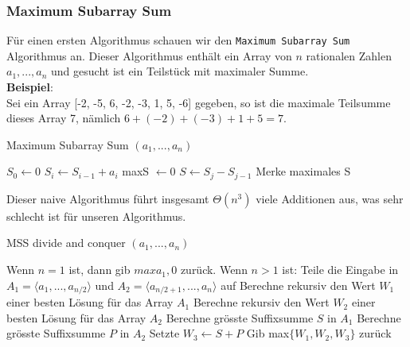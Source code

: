 \documentclass[a4paper]{article}
\begin{document}
    \subsubsection{Maximum Subarray Sum}
    Für einen ersten Algorithmus schauen wir den \texttt{Maximum Subarray Sum} Algorithmus an. Dieser Algorithmus enthält ein Array von $n$ rationalen Zahlen $a_1,..., a_n$ und gesucht ist ein Teilstück mit maximaler Summe.  \\
    \textbf{Beispiel}: \\
    Sei ein Array [-2, -5, 6, -2, -3, 1, 5, -6] gegeben, so ist die maximale Teilsumme dieses Array 7, nämlich $ 6 + (-2) + (-3) + 1 + 5 = 7$. \\
      
\begin{algorithm}
    \caption{Maximum Subarray Sum $(a_1,..., a_n)$}
    \label{alg:MSS-1}
    \begin{algorithmic}[1]
    \State $S_0 \gets 0$ 
        \State $S_i \gets S_{i-1} + a_i$ 
    \EndFor
    \State maxS $\gets 0$
            \State $S \gets S_j - S_{j-1}$ 
           \State Merke maximales S
        \EndFor
    \EndFor
    \EndFunction

    \end{algorithmic}
    
\end{algorithm}

Dieser naive Algorithmus führt insgesamt $\Theta(n^3)$ viele Additionen aus, was sehr schlecht ist für unseren Algorithmus.

\begin{algorithm}
 \caption{MSS divide and conquer $(a_1,..., a_n)$}
 \label{alg:MSS-Div}
 \begin{algorithmic}[1]
      \State Wenn $n=1$ ist, dann gib $max{a_1,0}$ zurück.
      \State Wenn $n>1$ ist:
      \State Teile die Eingabe in $A_1 = \langle a_1,...,a_{n/2} \rangle$ und $A_2 = \langle a_{n/2+1},...,a_{n} \rangle$ auf
      \State Berechne rekursiv den Wert $W_1$ einer besten Lösung für das Array $A_1$
      \State Berechne rekursiv den Wert $W_2$ einer besten Lösung für das Array $A_2$
      \State Berechne grösste Suffixsumme $S$ in $A_1$
      \State Berechne grösste Suffixsumme $P$ in $A_2$
      \State Setzte $W_3 \gets S+P$
      \State Gib max$\{W_1, W_2, W_3\}$ zurück
    \EndFunction
 \end{algorithmic}
\end{algorithm}
\end{document}
